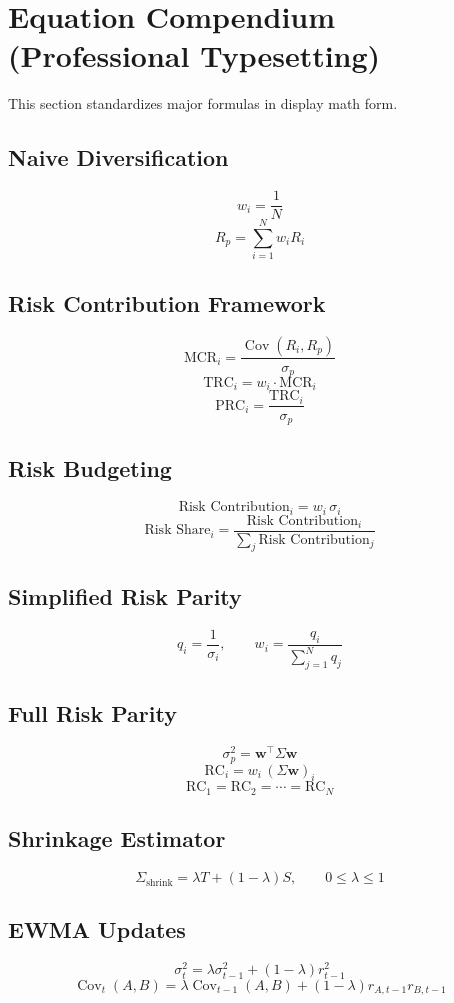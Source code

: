 \documentclass[
]{article}
\author{}
\date{}
\begin{document}
\section{Equation Compendium (Professional Typesetting)}

This section standardizes major formulas in display math form.

\subsection{Naive Diversification}
\[
w_i = \frac{1}{N}
\]
\[
R_p = \sum_{i=1}^{N} w_i R_i
\]

\subsection{Risk Contribution Framework}
\[
\mathrm{MCR}_i = \frac{\operatorname{Cov}(R_i, R_p)}{\sigma_p}
\]
\[
\mathrm{TRC}_i = w_i \cdot \mathrm{MCR}_i
\]
\[
\mathrm{PRC}_i = \frac{\mathrm{TRC}_i}{\sigma_p}
\]

\subsection{Risk Budgeting}
\[
\text{Risk Contribution}_i = w_i\,\sigma_i
\]
\[
\text{Risk Share}_i = \frac{\text{Risk Contribution}_i}{\sum_j \text{Risk Contribution}_j}
\]

\subsection{Simplified Risk Parity}
\[
q_i = \frac{1}{\sigma_i}, \qquad
w_i = \frac{q_i}{\sum_{j=1}^{N} q_j}
\]

\subsection{Full Risk Parity}
\[
\sigma_p^2 = \mathbf{w}^\top \Sigma \mathbf{w}
\]
\[
\mathrm{RC}_i = w_i\,(\Sigma\mathbf{w})_i
\]
\[
\mathrm{RC}_1 = \mathrm{RC}_2 = \cdots = \mathrm{RC}_N
\]

\subsection{Shrinkage Estimator}
\[
\Sigma_{\text{shrink}} = \lambda T + (1-\lambda)S,
\qquad 0 \le \lambda \le 1
\]

\subsection{EWMA Updates}
\[
\sigma_t^2 = \lambda\sigma_{t-1}^2 + (1-\lambda)r_{t-1}^2
\]
\[
\operatorname{Cov}_t(A,B)=\lambda\operatorname{Cov}_{t-1}(A,B)
+ (1-\lambda)r_{A,t-1}r_{B,t-1}
\]
\end{document}
